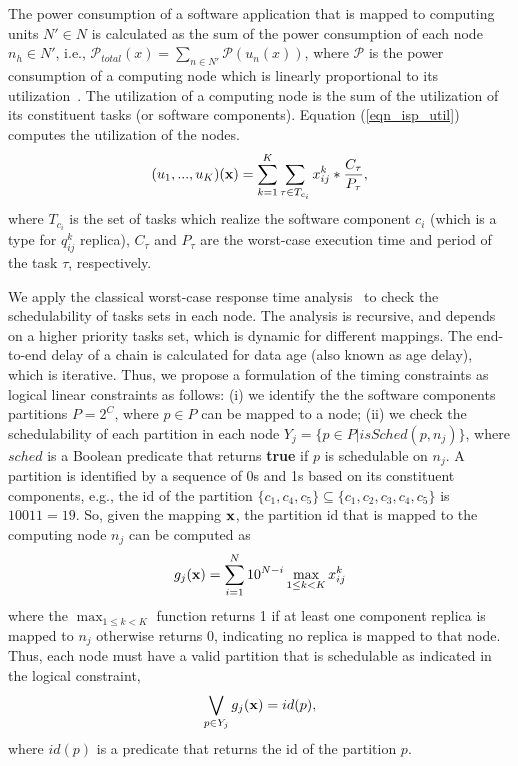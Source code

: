 The power consumption of a software application that is mapped to computing units $N'\in N$ is calculated as the sum of the power consumption of each node $n_h\in N'$, i.e., $\mathcal{P}_{total}(x)=\sum_{n\in N'}{\mathcal{P}(u_n(x))}$, where $\mathcal{P}$ is the power consumption of a computing node which is linearly proportional to its utilization~\cite{Mahmud5222}. The utilization of a computing node is the sum of the utilization of its constituent tasks (or software components). Equation (\ref{eqn_isp_util}) computes the utilization of the nodes.
\begin{align}
\label{eqn_isp_util}
	(u_1,...,u_K)(\x)=\sum_{k=1}^{K}\sum_{\tau\in T_{c_i}}{\xkij*\frac{C_\tau}{P_\tau}},
\end{align}
where $T_{c_i}$ is the set of tasks which realize the software component $c_i$ (which is a type for $q^{k}_{ij}$ replica), $C_\tau$ and $P_\tau$ are the worst-case execution time and  period of the task $\tau$, respectively.

We apply the classical worst-case response time analysis~\cite{Baruah2011Response-timeSystems} to check the schedulability of tasks sets in each node. The analysis is recursive, and depends on a higher priority tasks set, which is dynamic for different mappings. The end-to-end delay of a chain is calculated for data age (also known as age delay), which is iterative. Thus, we propose a formulation of the timing constraints as logical linear constraints as follows: (i) we identify the the software components partitions $P=2^C$, where $p\in P$ can be mapped to a node; (ii) we check the schedulability of each partition in each node $Y_j=\{p\in P| isSched(p,n_j)\}$, where $sched$ is a Boolean predicate that returns \textbf{true} if $p$ is schedulable on $n_j$.  A partition is identified by a sequence of 0s and 1s based on its constituent components, e.g., the id of the partition $\{c_1,c_4,c_5\}\subseteq \{c_1,c_2,c_3,c_4,c_5\}$ is $10011=19$. So, given the mapping $\textbf{x}$, the partition id that is mapped to the computing node $n_j$ can be computed as
\begin{align}
	g_j(\textbf{x})=\sum_{i=1}^{N}{10^{N-i}\max_{1\leq k< K}x^{k}_{ij}}
\end{align}
where the $\max_{1\leq k< K}$ function returns 1 if at least one component replica is mapped to $n_j$ otherwise returns 0, indicating no replica is mapped to that node. Thus, each node must have a valid partition that is schedulable as indicated in the logical constraint,
\begin{align}
\bigvee\limits_{p\in Y_j}g_j (\textbf{x})= id(p) ,
\end{align}
where $id(p)$ is a predicate that returns the id of the partition $p$.

